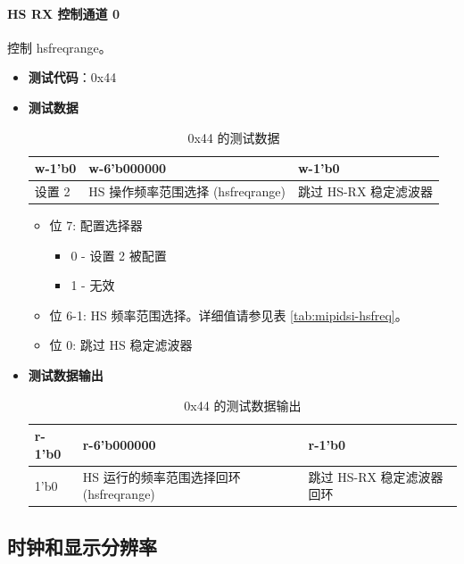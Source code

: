 \documentclass[main\_\_CN.tex]{subfiles}
\begin{document}
\paragraph{HS RX 控制通道 0}
\label{sec:test-code-0x44}
控制 hsfreqrange。

\begin{itemize}
    \item \textbf{测试代码}：0x44
    \item \textbf{测试数据}
        \begin{longtable}{ |p{2cm}|p{6cm}|p{6cm}|}
            \caption{0x44 的测试数据}
            \label{tab:test-data-0x44} \\
            \hline
            \rowcolor{lightgray}
            \textbf{w-1'b0} & \textbf{w-6'b000000} & \textbf{w-1'b0} \\ \hline
            设置 2 & HS 操作频率范围选择 (hsfreqrange) & 跳过 HS-RX 稳定滤波器 \\ \hline
        \end{longtable}

        \begin{itemize}
            \item 位 7: 配置选择器
                \begin{itemize}
                    \item 0 - 设置 2 被配置
                    \item 1 - 无效
                \end{itemize}
            \item 位 6-1: HS 频率范围选择。详细值请参见表 \ref{tab:mipidsi-hsfreq}。
            \item 位 0: 跳过 HS 稳定滤波器
        \end{itemize}
    \item \textbf{测试数据输出}
        \begin{longtable}{ |p{2cm}|p{6cm}|p{6cm}|}
            \caption{0x44 的测试数据输出}
            \label{tab:test-dout-0x44} \\
            \hline
            \rowcolor{lightgray}
            \textbf{r-1'b0} & \textbf{r-6'b000000} & \textbf{r-1'b0} \\ \hline
            1'b0 & HS 运行的频率范围选择回环 (hsfreqrange) & 跳过 HS-RX 稳定滤波器回环 \\ \hline
        \end{longtable}
\end{itemize}

% 
\subsection{时钟和显示分辨率}
\label{sec:clocks-and-display-resolution}
\end{document}
